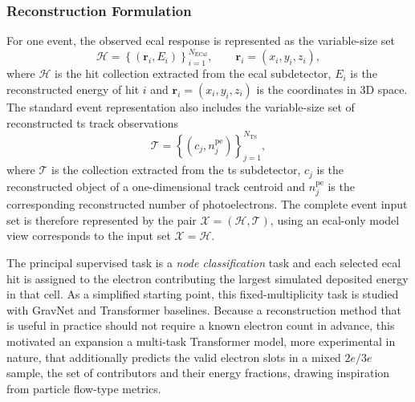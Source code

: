 \subsubsection{Reconstruction Formulation}
\label{sec:reconstr_formulation}

For one event, the observed \gls{ecal} response is represented as the
variable-size set
\begin{equation}
    \mathcal{H} =
    \left\{
    \left(\boldsymbol{r}_i,E_i\right)
    \right\}_{i=1}^{N_{\mathrm{ECal}}},
    \qquad
    \boldsymbol{r}_i=(x_i,y_i,z_i),
\end{equation}
where $\mathcal{H}$ is the hit collection extracted from the \gls{ecal} subdetector, \(E_i\) is the reconstructed energy of hit \(i\) and $\boldsymbol{r}_i=(x_i,y_i,z_i)$ is the coordinates in 3D space. The standard event
representation also includes the variable-size set of
reconstructed \gls{ts} track observations
\begin{equation}
    \mathcal{T} =
    \left\{
    \left(c_j,n^{\mathrm{pe}}_j\right)
    \right\}_{j=1}^{N_{\mathrm{TS}}},
\end{equation}
where $\mathcal{T}$ is the collection extracted from the \gls{ts} subdetector, \(c_j\) is the reconstructed object of a one-dimensional track centroid and
\(n^{\mathrm{pe}}_j\) is the corresponding reconstructed number of
photoelectrons. The complete event input set is therefore represented by the pair
\(\mathcal{X}=(\mathcal{H},\mathcal{T})\), using an \gls{ecal}-only model view corresponds to the input set \(\mathcal{X}=\mathcal{H}\). 


The principal supervised task is a \textit{node classification} task \cite{duarte2020-gnn-tracking} and each selected \gls{ecal} hit is assigned to the
electron contributing the largest simulated deposited energy in that cell.
As a simplified starting point, this fixed-multiplicity task is studied with GravNet and Transformer baselines.
Because a reconstruction method that is useful in practice should not require a known electron
count in advance, this motivated an expansion a multi-task
Transformer model, more experimental in nature, that additionally predicts the valid electron slots in a mixed \(2e/3e\) sample, the set of contributors and their energy fractions, drawing inspiration from particle flow-type metrics. 

